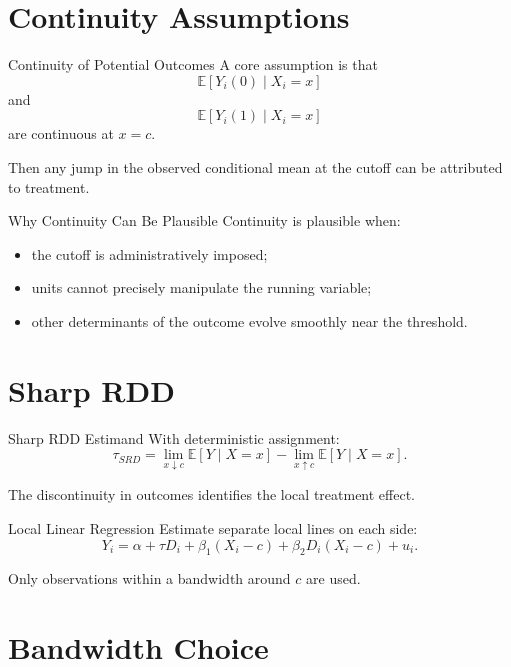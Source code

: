\documentclass[aspectratio=169,11pt]{beamer}
\newcommand{\E}{\mathbb{E}}
\begin{document}
\section{Continuity Assumptions}

\begin{frame}{Continuity of Potential Outcomes}
A core assumption is that
\[
\E[Y_i(0)\mid X_i=x]
\]
and
\[
\E[Y_i(1)\mid X_i=x]
\]
are continuous at \(x=c\).

Then any jump in the observed conditional mean at the cutoff can be attributed to treatment.
\end{frame}

\begin{frame}{Why Continuity Can Be Plausible}
Continuity is plausible when:
\begin{itemize}
\item the cutoff is administratively imposed;
\item units cannot precisely manipulate the running variable;
\item other determinants of the outcome evolve smoothly near the threshold.
\end{itemize}
\end{frame}

\section{Sharp RDD}

\begin{frame}{Sharp RDD Estimand}
With deterministic assignment:
\[
\tau_{SRD}
=
\lim_{x\downarrow c}\E[Y\mid X=x]
-
\lim_{x\uparrow c}\E[Y\mid X=x].
\]

The discontinuity in outcomes identifies the local treatment effect.
\end{frame}

\begin{frame}{Local Linear Regression}
Estimate separate local lines on each side:
\[
Y_i
=
\alpha
+
\tau D_i
+
\beta_1(X_i-c)
+
\beta_2D_i(X_i-c)
+
u_i.
\]

Only observations within a bandwidth around \(c\) are used.
\end{frame}

\section{Bandwidth Choice}
\end{document}
